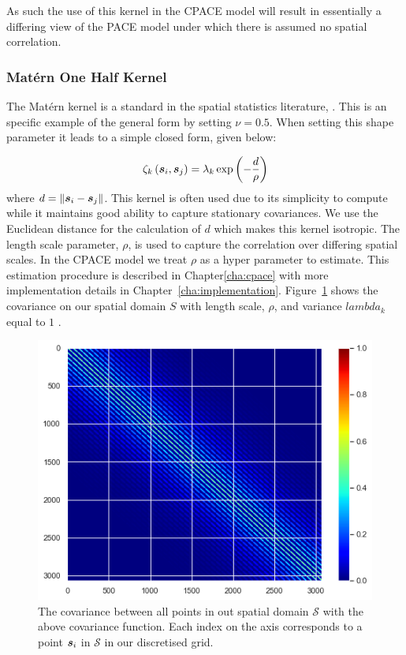 As such the use of this kernel in the CPACE model will result in essentially a differing view of the PACE model under which there is assumed no spatial correlation.

\subsubsection{Mat\'ern One Half Kernel \label{sssec:matern_one}}
The Mat\'ern kernel is a standard in the spatial statistics literature, \cite{cressie_statistics_2011}.
This is an specific example of the general form by setting $\nu=0.5$. 
When setting this shape parameter it leads to a simple closed form, given below:

\begin{equation}
	\zeta_k\left(\bm{{s}}_{i}, \bm{{s}}_{j}\right) = \lambda_k \exp \left( -\frac{d}{\rho} \right)
\end{equation}
where $d = \lVert \bm{{s}}_{i} - \bm{{s}}_{j} \rVert$.
This kernel is often used due to its simplicity to compute while it maintains good ability to capture stationary covariances.
We use the Euclidean distance for the calculation of $d$ which makes this kernel isotropic.
The length scale parameter, $\rho$, is used to capture the correlation over differing spatial scales.
In the CPACE model we treat $\rho$ as a hyper parameter to estimate.
This estimation procedure is described in Chapter\ref{cha:cpace} with more implementation details in Chapter~\ref{cha:implementation}.
Figure~\ref{fig:ex_mat_1} shows the covariance on our spatial domain $S$ with length scale, $\rho$,  and variance $lambda_k$ equal to $1$ .


\begin{figure}
	\centering
	\includegraphics[width=\textwidth]{ex_mat_1}
	\caption{The covariance between all points in out spatial domain $\mathcal{S}$ with the above covariance function. Each index on the axis corresponds to a point $\bm{{s}}_i$ in $\mathcal{S}$ in our discretised grid.}
	\label{fig:ex_mat_1}
\end{figure}

